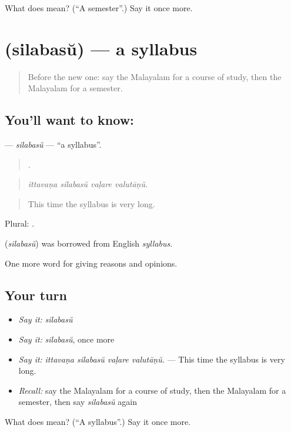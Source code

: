\begin{tcolorbox}[breakable,colback=teal!4,colframe=teal!35!black,title={Before you move on}]
What does  mean? (\textquotedblleft{}A semester\textquotedblright{}.) Say it once more.
\end{tcolorbox}
\section[\texorpdfstring{\ml{സിലബസ്} (silabasŭ)}{സിലബസ് (silabasŭ)}]{ (silabasŭ) — a syllabus}

\label{lesson:ML-C433-silabasu}



\begin{quote}
Before the new one: say the Malayalam for a course of study, then the Malayalam for a semester.
\end{quote}

\subsection*{You'll want to know: }
\textbf{} — \emph{silabasŭ} — \textquotedblleft{}a syllabus\textquotedblright{}.

\begin{quote}
   .
\end{quote}

\begin{quote}
\emph{ittavaṇa silabasŭ vaḷare valutāṇŭ.}
\end{quote}

\begin{quote}
This time the syllabus is very long.
\end{quote}

Plural: .

\begin{cousinweb}
\textbf{} (\emph{silabasŭ}) was borrowed from English \emph{syllabus}.
\end{cousinweb}

\begin{grammarlens}[title={What you've built}]
One more word for giving reasons and opinions.
\end{grammarlens}

\subsection*{Your turn}
\begin{itemize}
\raggedright
  \item \emph{Say it:} \emph{silabasŭ}
  \item \emph{Say it:} \emph{silabasŭ}, once more
  \item \emph{Say it:} \emph{ittavaṇa silabasŭ vaḷare valutāṇŭ.} — This time the syllabus is very long.
  \item \emph{Recall:} say the Malayalam for a course of study, then the Malayalam for a semester, then say \emph{silabasŭ} again
\end{itemize}

\begin{tcolorbox}[breakable,colback=teal!4,colframe=teal!35!black,title={Before you move on}]
What does  mean? (\textquotedblleft{}A syllabus\textquotedblright{}.) Say it once more.
\end{tcolorbox}
